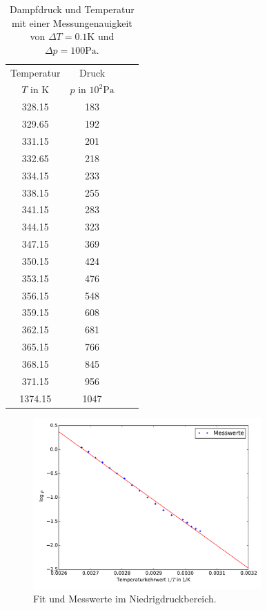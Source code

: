 \begin{table}
  \centering
  \begin{tabular}{c c c c}
    \toprule
    Temperatur & Druck \\
    $T$ in $\si{\kelvin}$ & $p$ in $ 10^2\si{\pascal}$ &  & \\
    \midrule
    328.15  &   183  &    &  \\
    329.65  &   192  &    &  \\
    331.15  &   201  &    &  \\
    332.65  &   218  &    &  \\
    334.15  &   233  &    &  \\
    338.15  &   255  &    &  \\
    341.15  &   283  &    &  \\
    344.15  &   323  &    &  \\
    347.15  &   369  &    &  \\
    350.15  &   424  &    &  \\
    353.15  &   476  &    &  \\
    356.15  &   548  &    &  \\
    359.15  &   608  &    &  \\
    362.15  &   681  &    &  \\
    365.15  &   766  &    &  \\
    368.15  &   845  &    &  \\
    371.15  &   956  &    &  \\
   1374.15  &  1047  &    &  \\
    \bottomrule
  \end{tabular}
  \caption{Dampfdruck und Temperatur mit einer Messungenauigkeit von
  $\Delta T=0.1\si{\kelvin}$ und $\Delta p=100 \si{\pascal}$.}
  \label{tab:messung1}
\end{table}
\begin{figure}
  \centering
  \includegraphics[width=0.78\textwidth]{verdampfungwaerme1.pdf}
  \caption{Fit und Messwerte im Niedrigdruckbereich.}
  \label{fig:fit1}
\end{figure}
